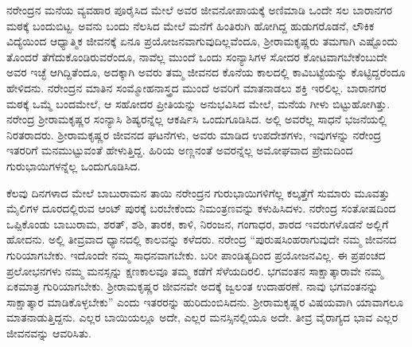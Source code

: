 ನರೇಂದ್ರನ ಮನೆಯ ವ್ಯವಹಾರ ಪೂರೈಸಿದ ಮೇಲೆ ಅವರ ಜೀವನೋಪಾಯಕ್ಕೆ ಅಣಿಮಾಡಿ ಒಂದೇ ಸಲ ಬಾರಾನಗರ ಮಠಕ್ಕೆ ಬಂದುಬಿಟ್ಟ. ಅವನು ಬಂದು ನೆಲಸಿದ ಮೇಲೆ ಮನೆಗೆ ಹಿಂತಿರುಗಿ ಹೋಗಿದ್ದ ಹುಡುಗರೊಡನೆ, ಲೌಕಿಕ ವಿದ್ಯೆಯಿಂದ ಆಧ್ಯಾತ್ಮಿಕ ಜೀವನಕ್ಕೆ ಏನೂ ಪ್ರಯೋಜನವಾಗುವುದಿಲ್ಲವೆಂದೂ, ಶ‍್ರೀರಾಮಕೃಷ್ಣರು ತಮಗಾಗಿ ಎಷ್ಟೊಂದು ತೊಂದರೆ ತೆಗೆದುಕೊಂಡಿರುವರೆಂದೂ, ನಾವೆಲ್ಲ ಮುಂದೆ ಒಂದು ಸಂನ್ಯಾಸಿಗಳ ಸೋದರ ಕೋಟವಾಗಬೇಕೆಂಬುದೇ ಅವರ ಇಚ್ಛೆ ಆಗಿದ್ದಿತೆಂದೂ, ಅದಕ್ಕಾಗಿ ಅವರು ತಮ್ಮ ಜೀವನದ ಕೊನೆಯ ಕಾಲದಲ್ಲಿ ಕಾವಿಬಟ್ಟೆಯನ್ನು ಕೊಟ್ಟಿದ್ದರೆಂದೂ ಹೇಳಿದನು. ನರೇಂದ್ರನ ಮಾತಿನ ಸಂಮ್ಮೋಹನಾಸ್ತ್ರದ ಮುಂದೆ ಅವರಿಗೆ ಮಾತನಾಡಲು ಶಕ್ತಿ ಇರಲಿಲ್ಲ. ಬಾರಾನಗರ ಮಠಕ್ಕೆ ಒಮ್ಮೆ ಬಂದಮೇಲೆ, ಆ ಸಹೋದರ ಪ್ರೀತಿಯನ್ನು ಅನುಭವಿಸಿದ ಮೇಲೆ, ಮನೆಯ ಗೀಳು ಬಿಟ್ಟುಹೋಗಿತ್ತು. ನರೇಂದ್ರ ಶ‍್ರೀರಾಮಕೃಷ್ಣರ ಸಂನ್ಯಾಸಿ ಶಿಷ್ಯರನ್ನೆಲ್ಲ ಆಕರ್ಷಿಸಿ ಒಂದುಗೂಡಿಸಿದ. ಅಲ್ಲಿ ಅವರೆಲ್ಲ ಸಾಧನೆ ಭಜನೆಯಲ್ಲಿ ನಿರತರಾದರು. ಶ‍್ರೀರಾಮಕೃಷ್ಣರ ಜೀವನದ ಘಟನೆಗಳು, ಅವರು ಮಾಡಿದ ಉಪದೇಶಗಳು, ಇವುಗಳನ್ನು ನರೇಂದ್ರ ಇತರರಿಗೆ ಮನಮುಟ್ಟುವಂತೆ ಹೇಳುತ್ತಿದ್ದ. ಹಿರಿಯ ಅಣ್ಣನಂತೆ ಅವರನ್ನೆಲ್ಲ ಅಮೋಘವಾದ ಪ್ರೇಮದಿಂದ ಗುರುಭಾಯಿಗಳನ್ನೆಲ್ಲ ಒಂದುಗೂಡಿಸಿದ.

ಕೆಲವು ದಿನಗಳಾದ ಮೇಲೆ ಬಾಬುರಾಮನ ತಾಯಿ ನರೇಂದ್ರನ ಗುರುಭಾಯಿಗಳಿಗೆಲ್ಲ ಕಲ್ಕತ್ತೆಗೆ ಸುಮಾರು ಮೂವತ್ತು ಮೈಲಿಗಳ ದೂರದಲ್ಲಿರುವ ಆಂಟ್ ಪುರಕ್ಕೆ ಬರಬೇಕೆಂದು ನಿಮಂತ್ರಣವನ್ನು ಕಳುಹಿಸಿದಳು. ನರೇಂದ್ರ ಸಂತೋಷದಿಂದ ಒಪ್ಪಿಕೊಂಡು ಬಾಬುರಾಮ, ಶರತ್, ಶಶಿ, ತಾರಕ, ಕಾಳಿ, ನಿರಂಜನ, ಗಂಗಾಧರ, ಶಾರದ ಇವರುಗಳೊಡನೆ ಅಲ್ಲಿಗೆ ಹೋದನು. ಅಲ್ಲಿ ತೀವ್ರವಾದ ಧ್ಯಾನದಲ್ಲಿ ಕಾಲವನ್ನು ಕಳೆದರು. ನರೇಂದ್ರ “ಪುರುಷಸಿಂಹರಾಗುವುದೇ ನಮ್ಮ ಜೀವನದ ಗುರಿಯಾಗಬೇಕು. ಇದೊಂದೇ ನಮ್ಮ ಸಾಧನವಾಗಬೇಕು. ಬರೀ ಪಾಂಡಿತ್ಯದಿಂದ ಪ್ರಯೋಜನವಿಲ್ಲ. ಈ ಪ್ರಪಂಚದ ಪ್ರಲೋಭನಗಳು ನಮ್ಮ ಮನಸ್ಸನ್ನು ಕ್ಷಣಕಾಲವೂ ತಮ್ಮ ಕಡೆಗೆ ಸೆಳೆಯದಿರಲಿ. ಭಗವಂತನ ಸಾಕ್ಷಾತ್ಕಾರಾವೇ ನಮ್ಮ ಏಕಮಾತ್ರ ಗುರಿಯಾಗಬೇಕು. ಶ‍್ರೀರಾಮಕೃಷ್ಣರ ಜೀವನವೇ ಅದಕ್ಕೆ ಜ್ವಲಂತ ಉದಾಹರಣೆ. ನಾವು ಭಗವಂತನನ್ನು ಸಾಕ್ಷಾತ್ಕಾರ ಮಾಡಿಕೊಳ್ಳಬೇಕು” ಎಂದು ಇತರರನ್ನು ಹುರಿದುಂಬಿಸಿದನು. ಶ‍್ರೀರಾಮಕೃಷ್ಣರ ವಿಷಯವಾಗಿ ಯಾವಾಗಲೂ ಮಾತನಾಡುತ್ತಿದ್ದನು. ಎಲ್ಲರ ಬಾಯಿಯಲ್ಲೂ ಅದೇ, ಎಲ್ಲರ ಮನಸ್ಸಿನಲ್ಲಿಯೂ ಅದೇ. ತೀವ್ರ ವೈರಾಗ್ಯದ ಭಾವ ಎಲ್ಲರ ಜೀವನವನ್ನು ಆವರಿಸಿತು.


